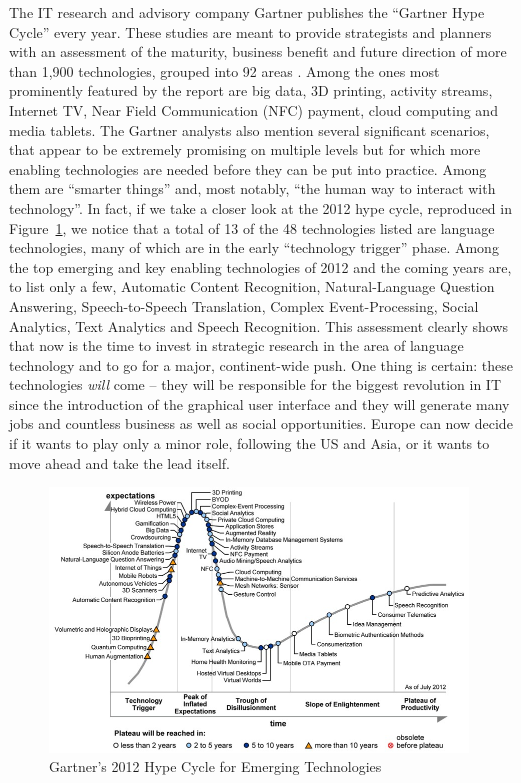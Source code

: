 \documentclass[10pt, plain]{../../metanetpaper}
\begin{document}
\begin{multicols}{2}
The IT research and advisory company Gartner publishes the ``Gartner Hype Cycle'' every year. These studies are meant to provide strategists and planners with an assessment of the maturity, business benefit and future direction of more than 1,900 technologies, grouped into 92 areas \cite{gartner2012}. Among the ones most prominently featured by the report are big data, 3D printing, activity streams, Internet TV, Near Field Communication (NFC) payment, cloud computing and media tablets. The Gartner analysts also mention several significant scenarios, that appear to be extremely promising on multiple levels but for which more enabling technologies are needed before they can be put into practice. Among them are  ``smarter things'' and, most notably, ``the human way to interact with technology''. In fact, if we take a closer look at the 2012 hype cycle, reproduced in Figure~\ref{fig:hype-cycle}, we notice that a total of 13 of the 48 technologies listed are language technologies, many of which are in the early ``technology trigger'' phase. Among the top emerging and key enabling technologies of 2012 and the coming years are, to list only a few, Automatic Content Recognition, Natural-Language Question Answering, Speech-to-Speech Translation, Complex Event-Processing, Social Analytics, Text Analytics and Speech Recognition. This assessment clearly shows that now is the time to invest in strategic research in the area of language technology and to go for a major, continent-wide push. One thing is certain: these technologies \emph{will} come -- they will be responsible for the biggest revolution in IT since the introduction of the graphical user interface and they will generate many jobs and countless business as well as social opportunities. Europe can now decide if it wants to play only a minor role, following the US and Asia, or it wants to move ahead and take the lead itself.
\end{multicols}

\begin{figure}[htb]
  \center
  \includegraphics[width=0.99\textwidth]{../_media/Gartner-2012-Hype-Cycle.jpeg}
  \caption{Gartner's 2012 Hype Cycle for Emerging Technologies \cite{gartner2012}}
  \label{fig:hype-cycle}
\end{figure}
\end{document}
